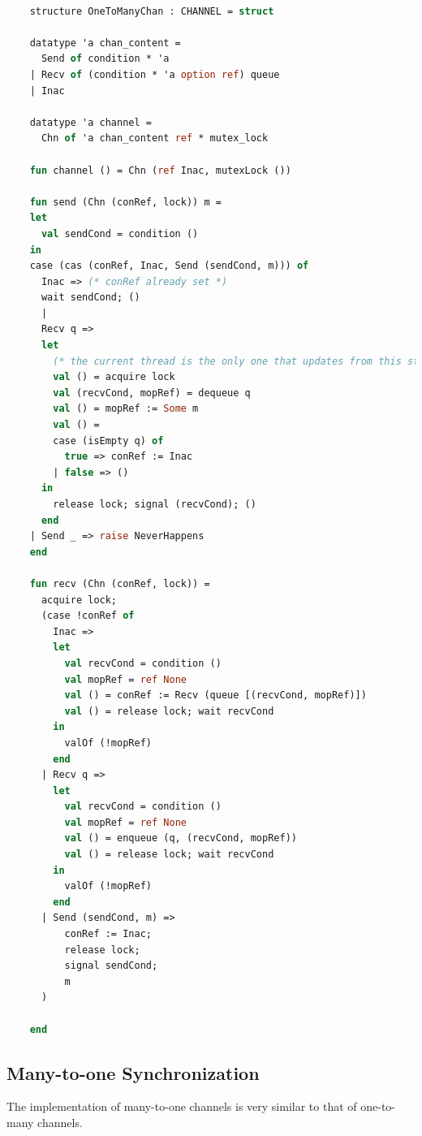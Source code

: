 \documentclass[10pt]{article}
\begin{document}
  \begin{lstlisting}[language=ML, mathescape]

    structure OneToManyChan : CHANNEL = struct

    datatype 'a chan_content =
      Send of condition * 'a
    | Recv of (condition * 'a option ref) queue
    | Inac

    datatype 'a channel =
      Chn of 'a chan_content ref * mutex_lock

    fun channel () = Chn (ref Inac, mutexLock ())

    fun send (Chn (conRef, lock)) m =
    let
      val sendCond = condition ()
    in
    case (cas (conRef, Inac, Send (sendCond, m))) of
      Inac => (* conRef already set *)
      wait sendCond; ()
      |
      Recv q =>
      let
        (* the current thread is the only one that updates from this state *)
        val () = acquire lock
        val (recvCond, mopRef) = dequeue q
        val () = mopRef := Some m
        val () =
        case (isEmpty q) of
          true => conRef := Inac
        | false => ()
      in
        release lock; signal (recvCond); ()
      end
    | Send _ => raise NeverHappens
    end

    fun recv (Chn (conRef, lock)) =
      acquire lock;
      (case !conRef of
        Inac =>
        let
          val recvCond = condition ()
          val mopRef = ref None
          val () = conRef := Recv (queue [(recvCond, mopRef)])
          val () = release lock; wait recvCond
        in
          valOf (!mopRef)
        end
      | Recv q =>
        let
          val recvCond = condition () 
          val mopRef = ref None
          val () = enqueue (q, (recvCond, mopRef))
          val () = release lock; wait recvCond
        in
          valOf (!mopRef)
        end
      | Send (sendCond, m) =>
          conRef := Inac;
          release lock;
          signal sendCond;
          m
      ) 

    end 
  \end{lstlisting}

\subsection{Many-to-one Synchronization}

The implementation of many-to-one channels is very similar to that of one-to-many channels.
\end{document}
